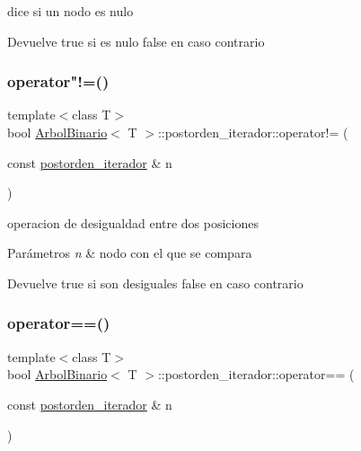 dice si un nodo es nulo 

\begin{DoxyReturn}{Devuelve}
true si es nulo false en caso contrario 
\end{DoxyReturn}
\mbox{\label{classArbolBinario_1_1postorden__iterador_a0a322877b7d8b222e69ad3c503c939a8}} 
\subsubsection{\texorpdfstring{operator"!=()}{operator!=()}}
{\footnotesize\ttfamily template$<$class T$>$ \\
bool \hyperlink{classArbolBinario}{Arbol\+Binario}$<$ T $>$\+::postorden\+\_\+iterador\+::operator!= (\begin{DoxyParamCaption}\item[{const \hyperlink{classArbolBinario_1_1postorden__iterador}{postorden\+\_\+iterador} \&}]{n }\end{DoxyParamCaption})\hspace{0.3cm}{\ttfamily [inline]}}



operacion de desigualdad entre dos posiciones 


\begin{DoxyParams}{Parámetros}
{\em n} & nodo con el que se compara \\
\hline
\end{DoxyParams}
\begin{DoxyReturn}{Devuelve}
true si son desiguales false en caso contrario 
\end{DoxyReturn}
\mbox{\label{classArbolBinario_1_1postorden__iterador_a4cdc13f9e5ab8479f777d6a18a984cf4}} 
\subsubsection{\texorpdfstring{operator==()}{operator==()}}
{\footnotesize\ttfamily template$<$class T$>$ \\
bool \hyperlink{classArbolBinario}{Arbol\+Binario}$<$ T $>$\+::postorden\+\_\+iterador\+::operator== (\begin{DoxyParamCaption}\item[{const \hyperlink{classArbolBinario_1_1postorden__iterador}{postorden\+\_\+iterador} \&}]{n }\end{DoxyParamCaption})\hspace{0.3cm}{\ttfamily [inline]}}




